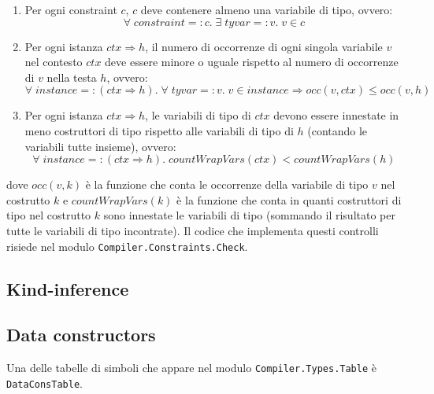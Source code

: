 \documentclass[10pt,a4paper]{article}
\begin{document}
\begin{enumerate}
    \item Per ogni constraint $ c $, $ c $ deve contenere almeno una variabile di tipo, ovvero:
    \[ \forall \; constraint =: c.\; \exists \; tyvar =: v.\; v \in c \]
    \item Per ogni istanza $ ctx \Rightarrow h $, il numero di occorrenze di ogni singola variabile $ v $ nel contesto
    $ ctx $ deve essere minore o uguale rispetto al numero di occorrenze di $ v $ nella testa $ h $, ovvero:
    \[ \forall \; instance =: (ctx \Rightarrow h).\; \forall \; tyvar =: v.\; v \in instance
    \Longrightarrow occ(v, ctx) \leq occ(v, h) \]
    \item Per ogni istanza $ ctx \Rightarrow h $, le variabili di tipo di $ ctx $ devono essere innestate in meno
    costruttori di tipo rispetto alle variabili di tipo di $ h $ (contando le variabili tutte insieme), ovvero: \newline
    \[ \forall \; instance =: (ctx \Rightarrow h).\; countWrapVars(ctx) < countWrapVars(h) \]
\end{enumerate}
dove $ occ(v, k) $ è la funzione che conta le occorrenze della variabile di tipo $ v $ nel costrutto $ k $ e
$ countWrapVars(k) $ è la funzione che conta in quanti costruttori di tipo nel costrutto $ k $ sono innestate le
variabili di tipo (sommando il risultato per tutte le variabili di tipo incontrate). Il codice che implementa questi
controlli risiede nel modulo \texttt{Compiler.Constraints.Check}.

\subsection{Kind-inference}

\subsection{Data constructors}
Una delle tabelle di simboli che appare nel modulo \texttt{Compiler.Types.Table} è \texttt{DataConsTable}.
\end{document}
